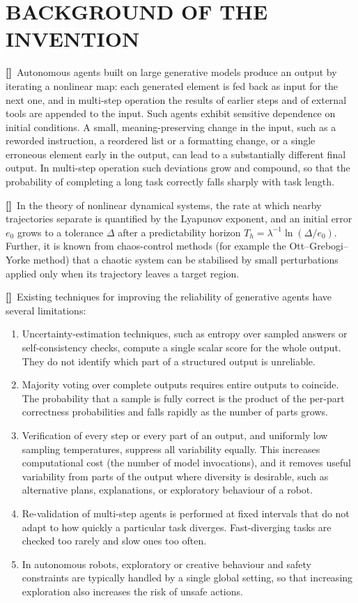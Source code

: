 \documentclass[12pt,a4paper]{article}
\newcounter{para}
\newcommand{\p}{\refstepcounter{para}\textbf{[\thepara]}\ }
\begin{document}
\section*{BACKGROUND OF THE INVENTION}

\p Autonomous agents built on large generative models produce an output by iterating a nonlinear map: each generated element is fed back as input for the next one, and in multi-step operation the results of earlier steps and of external tools are appended to the input. Such agents exhibit sensitive dependence on initial conditions. A small, meaning-preserving change in the input, such as a reworded instruction, a reordered list or a formatting change, or a single erroneous element early in the output, can lead to a substantially different final output. In multi-step operation such deviations grow and compound, so that the probability of completing a long task correctly falls sharply with task length.

\p In the theory of nonlinear dynamical systems, the rate at which nearby trajectories separate is quantified by the Lyapunov exponent, and an initial error $e_0$ grows to a tolerance $\Delta$ after a predictability horizon $T_h=\lambda^{-1}\ln(\Delta/e_0)$. Further, it is known from chaos-control methods (for example the Ott--Grebogi--Yorke method) that a chaotic system can be stabilised by small perturbations applied only when its trajectory leaves a target region.

\p Existing techniques for improving the reliability of generative agents have several limitations:
\begin{enumerate}[label=(\alph*)]
\item Uncertainty-estimation techniques, such as entropy over sampled answers or self-consistency checks, compute a single scalar score for the whole output. They do not identify which part of a structured output is unreliable.
\item Majority voting over complete outputs requires entire outputs to coincide. The probability that a sample is fully correct is the product of the per-part correctness probabilities and falls rapidly as the number of parts grows.
\item Verification of every step or every part of an output, and uniformly low sampling temperatures, suppress all variability equally. This increases computational cost (the number of model invocations), and it removes useful variability from parts of the output where diversity is desirable, such as alternative plans, explanations, or exploratory behaviour of a robot.
\item Re-validation of multi-step agents is performed at fixed intervals that do not adapt to how quickly a particular task diverges. Fast-diverging tasks are checked too rarely and slow ones too often.
\item In autonomous robots, exploratory or creative behaviour and safety constraints are typically handled by a single global setting, so that increasing exploration also increases the risk of unsafe actions.
\end{enumerate}
\end{document}
